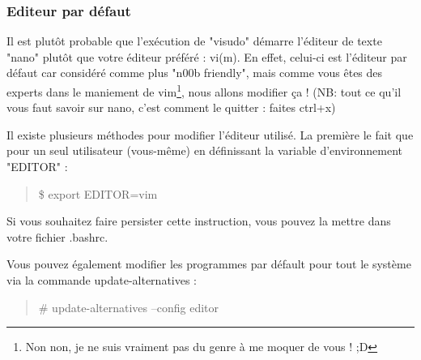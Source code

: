 \documentclass[a4paper]{article}
\newcommand{\commande}[1] {
    \begin{quote}
    \tt\raggedright #1 
    \end{quote}
}
\begin{document}
\subsubsection{Editeur par défaut}
\par Il est plutôt probable que l'exécution de "visudo" démarre l'éditeur de texte "nano" plutôt que votre éditeur préféré : vi(m). En effet, celui-ci est l'éditeur par défaut car considéré comme plus "n00b friendly", mais comme vous êtes des experts dans le maniement de vim\footnote{Non non, je ne suis vraiment pas du genre à me moquer de vous ! ;D}, nous allons modifier ça ! (NB: tout ce qu'il vous faut savoir sur nano, c'est comment le quitter : faites ctrl+x)
\par Il existe plusieurs méthodes pour modifier l'éditeur utilisé. La première le fait que pour un seul utilisateur (vous-même) en définissant la variable d'environnement "EDITOR" :
\commande{\$ export EDITOR=vim}
\par Si vous souhaitez faire persister cette instruction, vous pouvez la mettre dans votre fichier .bashrc.
\par Vous pouvez également modifier les programmes par défault pour tout le système via la commande update-alternatives :
\commande{\# update-alternatives --config editor}
\end{document}
